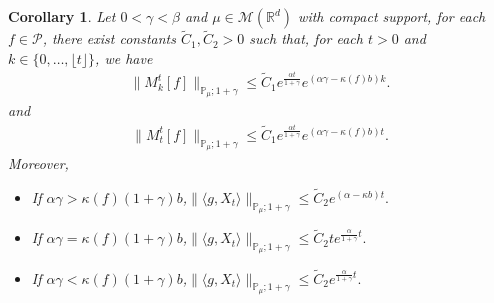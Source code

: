 \documentclass[12pt, a4paper]{amsart}
\newtheorem{cor}[thm]{Corollary}
\theoremstyle{definition}
\newtheorem{rem}[thm]{Remark}
\numberwithin{equation}{section}
\begin{document}
\begin{cor}\label{cor27}
Let $0< \gamma < \beta$ and $\mu \in \mathcal M(\mathbb R^d)$ with compact support, for each $f\in \mathcal{P}$, there exist constants $\tilde{C}_1,\tilde{C}_2>0$ such that, for each $t>0$ and $k \in \{0,\dots,\lfloor t \rfloor\}$, we have
\begin{align}
\label{eq: upper bound of 1+gamma moment of Mktf}
    \|M_k^t[f]\|_{\mathbb{P}_{\mu};1+\gamma}
    \leq \tilde{C}_1 e^{\frac{\alpha t}{1+\gamma}}e^{(\alpha \gamma - \kappa(f)b)k}.
\end{align}
and
\begin{align}
    \|M_t^t[f]\|_{\mathbb{P}_{\mu};1+\gamma}
    \leq \tilde{C}_1 e^{\frac{\alpha t}{1+\gamma}}e^{(\alpha \gamma - \kappa(f)b)t}.
\end{align}
Moreover,
\begin{itemize}
    \item If $\alpha\gamma > \kappa(f)(1+\gamma)b$,\quad $\|\langle g,X_t\rangle\|_{\mathbb{P}_{\mu};1+\gamma}\leq \tilde{C}_2 e^{(\alpha-\kappa b)t}.$
    \item If  $\alpha\gamma = \kappa(f)(1+\gamma)b$,\quad $\|\langle g,X_t\rangle\|_{\mathbb{P}_{\mu};1+\gamma}\leq \tilde{C}_2 te^{\frac{\alpha}{1+\gamma}t}.$
    \item If $\alpha\gamma < \kappa(f)(1+\gamma)b$,\quad$\|\langle g,X_t\rangle\|_{\mathbb{P}_{\mu};1+\gamma}\leq \tilde{C}_2 e^{\frac{\alpha}{1+\gamma}t}.$
\end{itemize}
\end{cor}
\begin{comment}

\begin{rem}
    The Lemma \eqref{lemma24} offers insights how to guess $\{F_t, t\geq0\}$ raised in Introduction. indeed
    \begin{itemize}
        \item  Large branching rate: when $\alpha\gamma > \kappa(g)(1+\gamma)b$, $F_t\approx e^{(\alpha-\kappa(g)b)t} $;
        \item  Critical branching rate: when $\alpha\gamma = \kappa(g)(1+\gamma)b$, $F_t\approx (te^{\alpha               t})^{\frac{1}{1+\beta}}\approx(t\|X_t\|)^{\frac{1}{1+\beta}}$;
        \item  Small branching rate: when $\alpha\gamma < \kappa(g)(1+\gamma)b$, $F_t\approx e^{\frac{\alpha t}{1+\beta}}\approx \|X_t\|^{\frac{1}{1+\beta}}$.
    \end{itemize}
\end{rem}
{\bf (Jianjie: We do not mention $F_t$ in Introduction, But we possibly need this mark in the future, so I decide to keep this part for now.)}
\end{comment}
\end{document}

